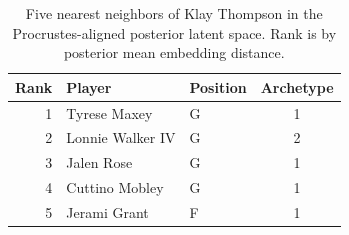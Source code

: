 \begin{table}[htbp]
  \centering\small
  \begin{tabular}{rllc}
    \toprule
    Rank & Player & Position & Archetype \\
    \midrule
    1 & Tyrese Maxey & G & 1 \\
    2 & Lonnie Walker IV & G & 2 \\
    3 & Jalen Rose & G & 1 \\
    4 & Cuttino Mobley & G & 1 \\
    5 & Jerami Grant & F & 1 \\
    \bottomrule
  \end{tabular}
  \caption{Five nearest neighbors of Klay Thompson in the Procrustes-aligned posterior latent space. Rank is by posterior mean embedding distance.}
  \label{tab:Klay_Thompson_neighbors}
\end{table}

